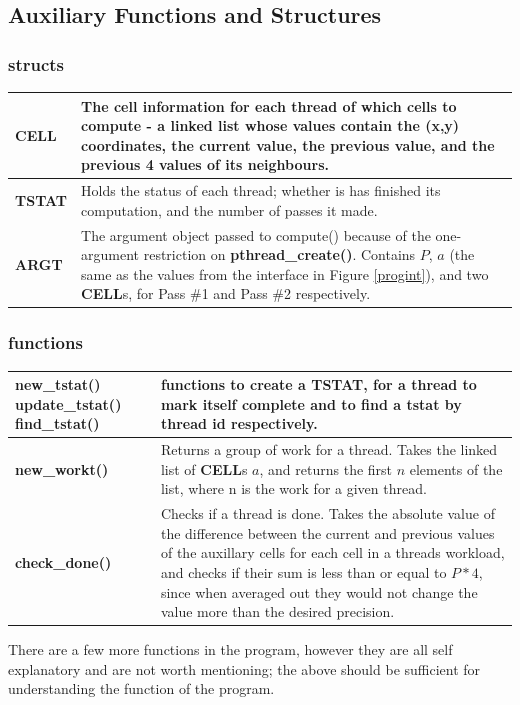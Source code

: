 \documentclass{article}
\begin{document}
\subsection{Auxiliary Functions and Structures}{
\subsubsection{structs}
 \begin{table}[H]
    \renewcommand*{\arraystretch}{1.2}
    \begin{tabularx}{\textwidth}{|l|X|}
        \hline 
        \textbf{CELL} & The cell information for each thread of which cells to compute - a linked list whose values contain the (x,y) coordinates, the current value, the previous value, and the previous 4 values of its neighbours.\\ \hline
        \textbf{TSTAT} & Holds the status of each thread; whether is has finished its computation, and the number of passes it made.\\\hline
        \textbf{ARGT}  & The argument object passed to compute() because of the one-argument restriction on \textbf{pthread\_create()}. Contains $P$, $a$ (the same as the values from the interface in Figure \ref{progint}), and two \textbf{CELL}s, for Pass \#1 and Pass \#2 respectively.\\\hline
    \end{tabularx}
 \end{table}
 \subsubsection{functions}
 \begin{table}[H]
    \renewcommand*{\arraystretch}{1.2}
    \begin{tabularx}{\textwidth}{|l|X|}
        \hline 
        \textbf{new\_tstat() update\_tstat() find\_tstat()} & functions to create a \textbf{TSTAT}, for a thread to mark itself complete and to find a tstat by thread id respectively. \\ \hline
        \textbf{new\_workt()} & Returns a group of work for a thread. Takes the linked list of \textbf{CELL}s $a$, and returns the first $n$ elements of the list, where n is the work for a given thread. \\ \hline
        \textbf{check\_done()} & Checks if a thread is done. Takes the absolute value of the difference between the current and previous values of the auxillary cells for each cell in a threads workload, and checks if their sum is less than or equal to $P*4$, since when averaged out they would not change the value more than the desired precision. \\ \hline
    \end{tabularx}
\end{table}
There are a few more functions in the program, however they are all self explanatory and are not worth mentioning; the above should be sufficient for understanding the function of the program.
}
\end{document}
